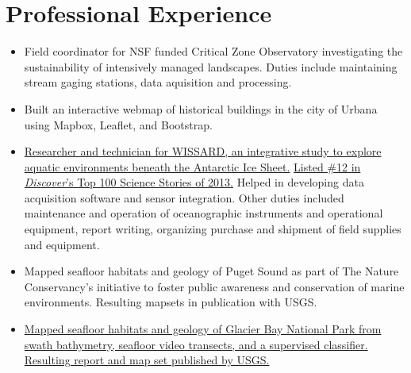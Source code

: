 \section{Professional Experience}

\begin{itemize}
\item Field coordinator for NSF funded Critical Zone Observatory investigating the sustainability of intensively managed landscapes. 
  Duties include maintaining stream gaging stations, data aquisition and processing. 
\end{itemize}

\begin{itemize}
\item Built an interactive webmap of historical buildings in the city of Urbana using Mapbox, Leaflet, and Bootstrap. 

\end{itemize}

\begin{itemize}
\item \href{http://www.wissard.org}{Researcher and technician for WISSARD, an
  integrative study to explore aquatic environments beneath the Antarctic Ice
  Sheet.}
  \href{http://discovermagazine.com/2014/jan-feb/12-the-search-for-life-trapped-under-ice}
       {Listed \#12 in \textit{Discover}'s Top 100 Science Stories of 2013.} Helped in developing data acquisition software and sensor integration.
       Other duties included maintenance and operation of oceanographic instruments and operational equipment,
       report writing, organizing purchase and shipment of field supplies and equipment.
  
\item Mapped seafloor habitats and geology of Puget Sound as part of The Nature
  Conservancy's initiative to foster public awareness and conservation of marine
  environments. Resulting mapsets in publication with USGS.

\item \href{http://pubs.usgs.gov/sim/3253/}{Mapped seafloor habitats and geology
  of Glacier Bay National Park from swath bathymetry, seafloor video transects, and a supervised classifier. Resulting report and map set published by USGS.}
  
\end{itemize}

